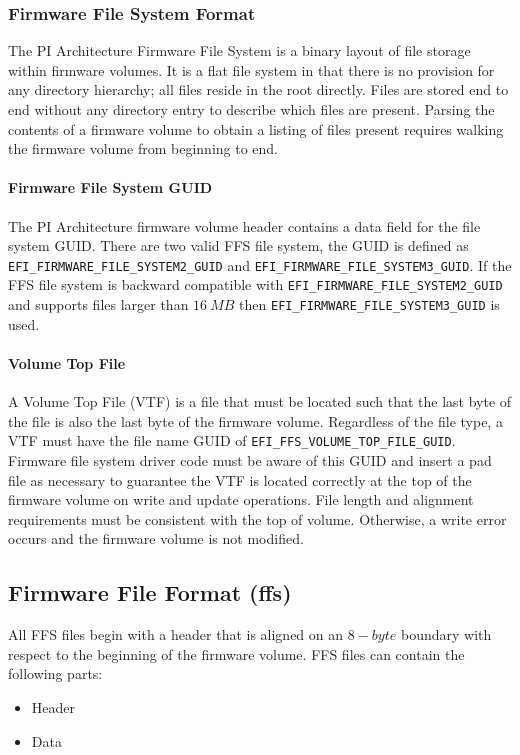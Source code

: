 \subsubsection{Firmware File System Format}
The PI Architecture Firmware File System is a binary layout of file storage within firmware
volumes. It is a flat file system in that there is no provision for any directory hierarchy; all files
reside in the root directly. Files are stored end to end without any directory entry to describe which files are present. Parsing the contents of a firmware volume to obtain a listing of files present requires walking the firmware volume from beginning to end.

\paragraph{Firmware File System GUID} The PI Architecture firmware volume header contains a data field for the file system GUID. There are two valid FFS file system, the GUID is defined as \verb|EFI_FIRMWARE_FILE_SYSTEM2_GUID| and \verb|EFI_FIRMWARE_FILE_SYSTEM3_GUID|.
If the FFS file system is backward compatible with \verb|EFI_FIRMWARE_FILE_SYSTEM2_GUID| and supports files larger than $ 16 \ MB $ then \verb|EFI_FIRMWARE_FILE_SYSTEM3_GUID| is used.

\paragraph{Volume Top File} A Volume Top File (VTF) is a file that must be located such that the last byte of the file is also the last byte of the firmware volume. Regardless of the file type, a VTF must have the file name GUID of \verb|EFI_FFS_VOLUME_TOP_FILE_GUID|.
Firmware file system driver code must be aware of this GUID and insert a pad file as necessary to guarantee the VTF is located correctly at the top of the firmware volume on write and update operations. File length and alignment requirements must be consistent with the top of volume. Otherwise, a write error occurs and the firmware volume is not modified.

\subsection{Firmware File Format (\gls{ffs})}
All FFS files begin with a header that is aligned on an $ 8-byte $ boundary with respect to the beginning
of the firmware volume. FFS files can contain the following parts:
\begin{itemize}
	\item Header
	\item Data
\end{itemize}

